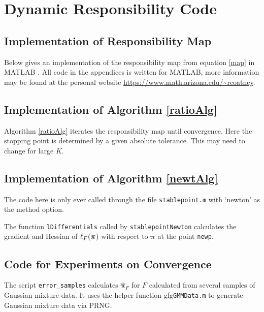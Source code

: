 \renewcommand{\thesubsection}{\Alph{subsection}}

\chapter{Dynamic Responsibility Code}\label{app:DRcode}
\section{Implementation of Responsibility Map}\label{code:map}
Below gives an implementation of the responsibility map from equation \eqref{map} in MATLAB \cite{MATLAB:2020a}. All code in the appendices is written for MATLAB, more information may be found at the personal website \url{https://www.math.arizona.edu/~rcoatney}.



\newpage
\section{Implementation of Algorithm \ref{ratioAlg}}\label{code:ratioAlg}
Algorithm \ref{ratioAlg} iterates the responsibility map until convergence.  Here the stopping point is determined by a given absolute tolerance.  This may need to change for large $K$.


\newpage
\section{Implementation of Algorithm \ref{newtAlg}}\label{code:newtAlg}
The code here is only ever called through the file \verb|stablepoint.m| with `newton' as the method option. 


The function \verb|lDifferentials| called by \verb|stablepointNewton| calculates the gradient and Hessian of \( \ell_{F}({\bm\pi}) \) with respect to \( \bm\pi \) at the point \verb|newp|.

			
\section{Code for Experiments on Convergence}\label{code:ExpConv}
The script \verb|error_samples| calculates \( \hat{\bm \pi}_F \) for \( F \) calculated from several samples of Gaussian mixture data. It uses the helper function gfg\verb|GMMData.m| to generate Gaussian mixture data via PRNG.

